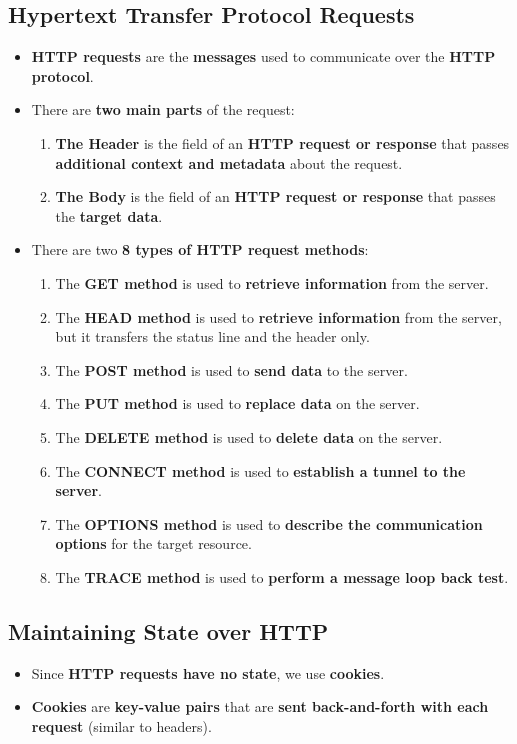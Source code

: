 \documentclass[16pt]{article}
\begin{document}
    \subsection*{Hypertext Transfer Protocol Requests}
    \begin{itemize}
        \item \textbf{HTTP requests} are the \textbf{messages} used to communicate over the \textbf{HTTP protocol}.
        \item There are \textbf{two main parts} of the request:
        \begin{enumerate}
            \item \textbf{The Header} is the field of an \textbf{HTTP request or response} that passes \textbf{additional context and metadata} about the request.
            \item \textbf{The Body} is the field of an \textbf{HTTP request or response} that passes the \textbf{target data}.
        \end{enumerate}
        \item There are two \textbf{8 types of HTTP request methods}:
        \begin{enumerate}
            \item The \textbf{GET method} is used to \textbf{retrieve information} from the server.
            \item The \textbf{HEAD method} is used to \textbf{retrieve information} from the server, but it transfers the status line and the header only.
            \item The \textbf{POST method} is used to \textbf{send data} to the server.
            \item The \textbf{PUT method} is used to \textbf{replace data} on the server.
            \item The \textbf{DELETE method} is used to \textbf{delete data} on the server.
            \item The \textbf{CONNECT method} is used to \textbf{establish a tunnel to the server}.
            \item The \textbf{OPTIONS method} is used to \textbf{describe the communication options} for the target resource.
            \item The \textbf{TRACE method} is used to \textbf{perform a message loop back test}.
        \end{enumerate}
    \end{itemize}
    
    \subsection*{Maintaining State over HTTP}
    \begin{itemize}
        \item Since \textbf{HTTP requests have no state}, we use \textbf{cookies}.
        \item \textbf{Cookies} are \textbf{key-value pairs} that are \textbf{sent back-and-forth with each request} (similar to headers).
    \end{itemize}
\end{document}
